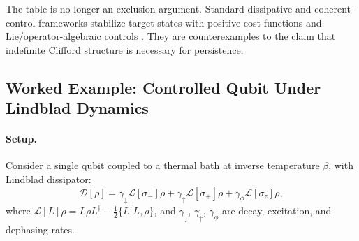 \documentclass[12pt,a4paper,openany]{book}
\begin{document}
\begin{table}[h]
\centering
{}
\caption{Candidate control frameworks after separating the positive Lyapunov metric $G$ from any Clifford/read-out form $q$.}
\label{B-tab:exclusion}
\end{table}

The table is no longer an exclusion argument.  Standard dissipative and coherent-control frameworks stabilize target states with positive cost functions and Lie/operator-algebraic controls \cite{Verstraete2009,Diehl2008,TicozziViola2008,Mirrahimi2005}.  They are counterexamples to the claim that indefinite Clifford structure is necessary for persistence.

\subsection{Worked Example: Controlled Qubit Under Lindblad Dynamics}
\label{B-sec:toymodel}

\paragraph{Setup.}
Consider a single qubit coupled to a thermal bath at inverse temperature $\beta$, with Lindblad dissipator:
\begin{equation}
\mathcal{D}[\rho] = \gamma_\downarrow \mathcal{L}[\sigma_-]\rho + \gamma_\uparrow \mathcal{L}[\sigma_+]\rho + \gamma_\phi \mathcal{L}[\sigma_z]\rho,
\end{equation}
where $\mathcal{L}[L]\rho = L\rho L^\dagger - \frac{1}{2}\{L^\dagger L, \rho\}$, and $\gamma_\downarrow$, $\gamma_\uparrow$, $\gamma_\phi$ are decay, excitation, and dephasing rates.
\end{document}
